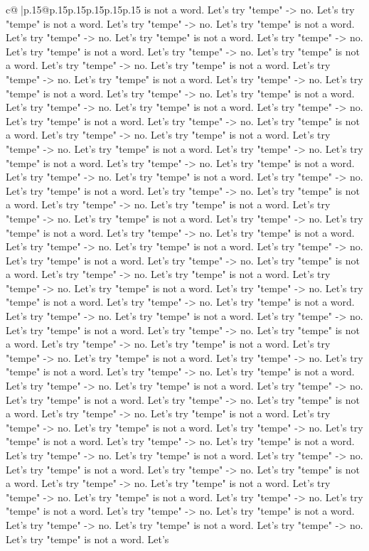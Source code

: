 \documentclass{article}
\begin{document}
{\begin{supertabular}{c@{$\;$}|p{.15\linewidth}@{}p{.15\linewidth}p{.15\linewidth}p{.15\linewidth}p{.15\linewidth}p{.15\linewidth}}
{{{is not a word. Let's try "tempe" {-}> no. Let's try "tempe" is not a word. Let's try "tempe" {-}> no. Let's try "tempe" is not a word. Let's try "tempe" {-}> no. Let's try "tempe" is not a word. Let's try "tempe" {-}> no. Let's try "tempe" is not a word. Let's try "tempe" {-}> no. Let's try "tempe" is not a word. Let's try "tempe" {-}> no. Let's try "tempe" is not a word. Let's try "tempe" {-}> no. Let's try "tempe" is not a word. Let's try "tempe" {-}> no. Let's try "tempe" is not a word. Let's try "tempe" {-}> no. Let's try "tempe" is not a word. Let's try "tempe" {-}> no. Let's try "tempe" is not a word. Let's try "tempe" {-}> no. Let's try "tempe" is not a word. Let's try "tempe" {-}> no. Let's try "tempe" is not a word. Let's try "tempe" {-}> no. Let's try "tempe" is not a word. Let's try "tempe" {-}> no. Let's try "tempe" is not a word. Let's try "tempe" {-}> no. Let's try "tempe" is not a word. Let's try "tempe" {-}> no. Let's try "tempe" is not a word. Let's try "tempe" {-}> no. Let's try "tempe" is not a word. Let's try "tempe" {-}> no. Let's try "tempe" is not a word. Let's try "tempe" {-}> no. Let's try "tempe" is not a word. Let's try "tempe" {-}> no. Let's try "tempe" is not a word. Let's try "tempe" {-}> no. Let's try "tempe" is not a word. Let's try "tempe" {-}> no. Let's try "tempe" is not a word. Let's try "tempe" {-}> no. Let's try "tempe" is not a word. Let's try "tempe" {-}> no. Let's try "tempe" is not a word. Let's try "tempe" {-}> no. Let's try "tempe" is not a word. Let's try "tempe" {-}> no. Let's try "tempe" is not a word. Let's try "tempe" {-}> no. Let's try "tempe" is not a word. Let's try "tempe" {-}> no. Let's try "tempe" is not a word. Let's try "tempe" {-}> no. Let's try "tempe" is not a word. Let's try "tempe" {-}> no. Let's try "tempe" is not a word. Let's try "tempe" {-}> no. Let's try "tempe" is not a word. Let's try "tempe" {-}> no. Let's try "tempe" is not a word. Let's try "tempe" {-}> no. Let's try "tempe" is not a word. Let's try "tempe" {-}> no. Let's try "tempe" is not a word. Let's try "tempe" {-}> no. Let's try "tempe" is not a word. Let's try "tempe" {-}> no. Let's try "tempe" is not a word. Let's try "tempe" {-}> no. Let's try "tempe" is not a word. Let's try "tempe" {-}> no. Let's try "tempe" is not a word. Let's try "tempe" {-}> no. Let's try "tempe" is not a word. Let's try "tempe" {-}> no. Let's try "tempe" is not a word. Let's try "tempe" {-}> no. Let's try "tempe" is not a word. Let's try "tempe" {-}> no. Let's try "tempe" is not a word. Let's try "tempe" {-}> no. Let's try "tempe" is not a word. Let's try "tempe" {-}> no. Let's try "tempe" is not a word. Let's try "tempe" {-}> no. Let's try "tempe" is not a word. Let's try "tempe" {-}> no. Let's try "tempe" is not a word. Let's try "tempe" {-}> no. Let's try "tempe" is not a word. Let's try "tempe" {-}> no. Let's try "tempe" is not a word. Let's try "tempe" {-}> no. Let's try "tempe" is not a word. Let's try "tempe" {-}> no. Let's try "tempe" is not a word. Let's try "tempe" {-}> no. Let's try "tempe" is not a word. Let's try "tempe" {-}> no. Let's try "tempe" is not a word. Let's try "tempe" {-}> no. Let's try "tempe" is not a word. Let's }}}
\end{supertabular}}
\end{document}
